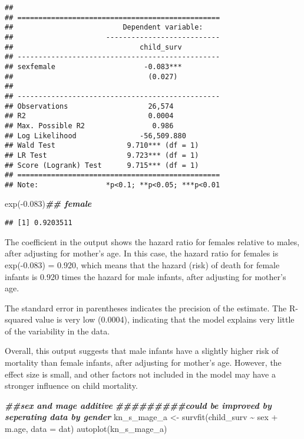 \documentclass[
]{article}
\newenvironment{Shaded}{\begin{snugshade}}{\end{snugshade}}
\newcommand{\AttributeTok}[1]{\textcolor[rgb]{0.77,0.63,0.00}{#1}}
\newcommand{\DocumentationTok}[1]{\textcolor[rgb]{0.56,0.35,0.01}{\textbf{\textit{#1}}}}
\newcommand{\FloatTok}[1]{\textcolor[rgb]{0.00,0.00,0.81}{#1}}
\newcommand{\FunctionTok}[1]{\textcolor[rgb]{0.00,0.00,0.00}{#1}}
\newcommand{\NormalTok}[1]{#1}
\newcommand{\OtherTok}[1]{\textcolor[rgb]{0.56,0.35,0.01}{#1}}
\newcommand{\SpecialCharTok}[1]{\textcolor[rgb]{0.00,0.00,0.00}{#1}}
\begin{document}
\begin{verbatim}
## 
## ================================================
##                          Dependent variable:    
##                      ---------------------------
##                              child_surv         
## ------------------------------------------------
## sexfemale                     -0.083***         
##                                (0.027)          
##                                                 
## ------------------------------------------------
## Observations                   26,574           
## R2                             0.0004           
## Max. Possible R2                0.986           
## Log Likelihood               -56,509.880        
## Wald Test                 9.710*** (df = 1)     
## LR Test                   9.723*** (df = 1)     
## Score (Logrank) Test      9.715*** (df = 1)     
## ================================================
## Note:                *p<0.1; **p<0.05; ***p<0.01
\end{verbatim}

\begin{Shaded}
\begin{Highlighting}[]
\FunctionTok{exp}\NormalTok{(}\SpecialCharTok{{-}}\FloatTok{0.083}\NormalTok{)}\DocumentationTok{\#\# female}
\end{Highlighting}
\end{Shaded}

\begin{verbatim}
## [1] 0.9203511
\end{verbatim}

The coefficient in the output shows the hazard ratio for females
relative to males, after adjusting for mother's age. In this case, the
hazard ratio for females is exp(-0.083) = 0.920, which means that the
hazard (risk) of death for female infants is 0.920 times the hazard for
male infants, after adjusting for mother's age.

The standard error in parentheses indicates the precision of the
estimate. The R-squared value is very low (0.0004), indicating that the
model explains very little of the variability in the data.

Overall, this output suggests that male infants have a slightly higher
risk of mortality than female infants, after adjusting for mother's age.
However, the effect size is small, and other factors not included in the
model may have a stronger influence on child mortality.

\begin{Shaded}
\begin{Highlighting}[]
\DocumentationTok{\#\#sex and mage additive}
\DocumentationTok{\#\#\#\#\#\#\#\#\#could be improved by seperating data by gender}
\NormalTok{kn\_s\_mage\_a }\OtherTok{\textless{}{-}} \FunctionTok{survfit}\NormalTok{(child\_surv }\SpecialCharTok{\textasciitilde{}}\NormalTok{ sex }\SpecialCharTok{+}\NormalTok{ m.age, }\AttributeTok{data =}\NormalTok{ dat)}
\FunctionTok{autoplot}\NormalTok{(kn\_s\_mage\_a)}
\end{Highlighting}
\end{Shaded}
\end{document}
